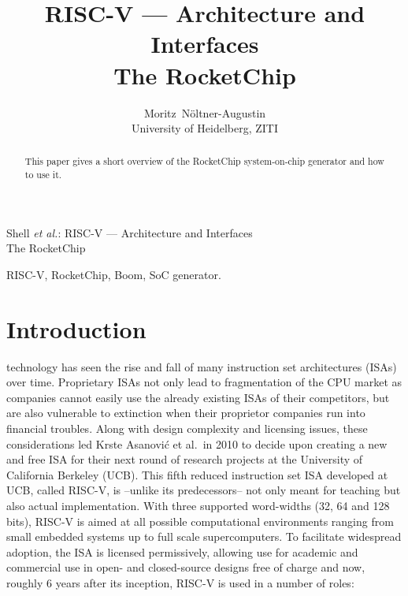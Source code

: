 \documentclass[journal,a4paper]{IEEEtran}
\def\krste/{Krste Asanovi\'c}
\begin{document}


\title{RISC-V --- Architecture and Interfaces\\The RocketChip}


\author{Moritz~N\"oltner-Augustin\\%
University of Heidelberg, ZITI}

%
{Shell \MakeLowercase{\textit{et al.}}: RISC-V --- Architecture and Interfaces\\The RocketChip}

\maketitle

\begin{abstract}
	This paper gives a short overview of the RocketChip system-on-chip generator and how to use it.
\end{abstract}

\begin{IEEEkeywords}
	RISC-V, RocketChip, Boom, SoC generator.
\end{IEEEkeywords}


\section{Introduction}
 technology has seen the rise and fall of many instruction set architectures (ISAs) over time.
Proprietary ISAs not only lead to fragmentation of the CPU market as companies cannot easily use the already existing ISAs of their competitors, but are also vulnerable to extinction when their proprietor companies run into financial troubles.
Along with design complexity and licensing issues, these considerations led \krste/ et al.\ in 2010 to decide upon creating a new and free ISA for their next round of research projects at the University of California Berkeley (UCB).
This fifth reduced instruction set ISA developed at UCB, called RISC-V\cite{riscv}, is --unlike its predecessors-- not only meant for teaching but also actual implementation.
With three supported word-widths (32, 64 and 128 bits\cite{riscv-vid}), RISC-V is aimed at all possible computational environments ranging from small embedded systems up to full scale supercomputers.
To facilitate widespread adoption, the ISA is licensed permissively, allowing use for academic and commercial use in open- and closed-source designs free of charge and now, roughly 6 years after its inception, RISC-V is used in a number of roles:
\end{document}
